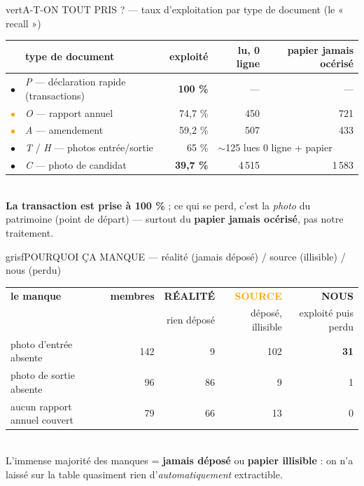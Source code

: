\documentclass[10pt,a4paper]{article}
\newcommand{\feu}[1]{\textcolor{#1}{\Large$\bullet$}}
\newcommand{\fv}{\feu{vert}}\newcommand{\fo}{\feu{orange}}\newcommand{\fr}{\feu{rouge}}
\begin{document}
\begin{bloc}{vert}{A-T-ON TOUT PRIS ? --- taux d'exploitation par type de document (le « recall »)}
\footnotesize
\begin{tabular}{@{}c l r r r@{}}
 & \textbf{type de document} & \textbf{exploité} & \textbf{lu, 0 ligne} & \textbf{papier jamais océrisé}\\
\midrule
\fv & \emph{P} --- déclaration rapide (transactions) & \textbf{100 \%} & --- & ---\\
\fo & \emph{O} --- rapport annuel & 74,7 \% & 450 & 721\\
\fo & \emph{A} --- amendement & 59,2 \% & 507 & 433\\
\fr & \emph{T} / \emph{H} --- photos entrée/sortie & 65 \% & \multicolumn{2}{l}{$\sim$125 lues 0 ligne + papier}\\
\fr & \emph{C} --- photo de candidat & \textbf{39,7 \%} & 4\,515 & 1\,583\\
\end{tabular}\\[1mm]
{\scriptsize\color{grisf} \textbf{La transaction est prise à 100 \%} ; ce qui se perd, c'est la \emph{photo} du
patrimoine (point de départ) --- surtout du \textbf{papier jamais océrisé}, pas notre traitement.}
\end{bloc}

\begin{bloc}{grisf}{POURQUOI ÇA MANQUE --- réalité (jamais déposé) / source (illisible) / nous (perdu)}
\footnotesize
\begin{tabular}{@{}l r r r r@{}}
 \textbf{le manque} & \textbf{membres} & \textcolor{grisf}{\textbf{RÉALITÉ}} & \textcolor{orange}{\textbf{SOURCE}} & \textcolor{rouge}{\textbf{NOUS}}\\
 & & rien déposé & déposé, illisible & exploité puis perdu\\
\midrule
photo d'entrée absente & 142 & 9 & 102 & \textbf{31}\\
photo de sortie absente & 96 & 86 & 9 & 1\\
aucun rapport annuel couvert & 79 & 66 & 13 & 0\\
\end{tabular}\\[1mm]
{\scriptsize\color{grisf} L'immense majorité des manques = \textbf{jamais déposé} ou \textbf{papier illisible} :
on n'a laissé sur la table quasiment rien d'\emph{automatiquement} extractible.}
\end{bloc}
\end{document}
